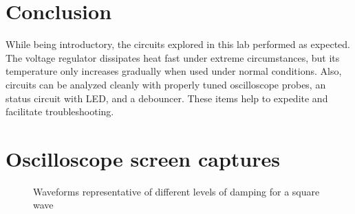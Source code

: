 \documentclass[11pt]{article}
\begin{document}
\section{Conclusion}

While being introductory, the circuits explored in this lab performed as expected. The voltage regulator dissipates heat fast under extreme circumstances, but its temperature only increases gradually when used under normal conditions. Also, circuits can be analyzed cleanly with properly tuned oscilloscope probes, an status circuit with LED, and a debouncer. These items help to expedite and facilitate troubleshooting.

\section*{Oscilloscope screen captures}

\begin{figure}
	\centering
	\caption{Waveforms representative of different levels of damping for a square wave}
	\label{fig:damping}
\end{figure}
\end{document}
